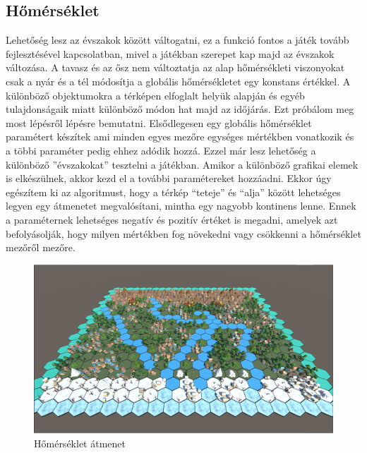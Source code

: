 
\subsection{Hőmérséklet}

Lehetőség lesz az évszakok között váltogatni, ez a funkció fontos a játék tovább fejlesztésével kapcsolatban, mivel a játékban szerepet kap majd az évszakok változása. A tavasz és az ősz nem változtatja az alap hőmérsékleti viszonyokat csak a nyár és a tél módosítja a globális hőmérsékletet egy konstans értékkel. 
\newline
\newline A különböző objektumokra a térképen elfoglalt helyük alapján és egyéb tulajdonságaik miatt különböző módon hat majd az időjárás. Ezt próbálom meg most lépésről lépésre bemutatni.
\newline
\newline Elsődlegesen egy globális hőmérséklet paramétert készítek ami minden egyes mezőre egységes mértékben vonatkozik és a többi paraméter pedig ehhez adódik hozzá. Ezzel már lesz lehetőség a különböző ''évszakokat'' tesztelni a játékban. Amikor a különböző grafikai elemek is elkészülnek, akkor kezd el a további paramétereket hozzáadni.
\newline
\newline Ekkor úgy egészítem ki az algoritmust, hogy a térkép “teteje” és “alja” között lehetséges legyen egy átmenetet megvalósítani, mintha egy nagyobb kontinens lenne. Ennek a paraméternek lehetséges negatív és pozitív értéket is megadni, amelyek azt befolyásolják, hogy milyen mértékben fog növekedni vagy csökkenni a hőmérséklet mezőről mezőre.

\begin{figure}[h!]
\centering
\includegraphics[scale=0.5]{kepek/transition.png}
\caption{Hőmérséklet átmenet}
\label{fig:transition}
\end{figure}

